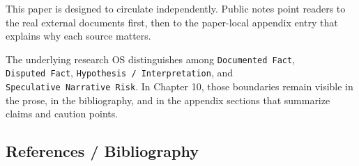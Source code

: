 \documentclass[
  american,
  11pt,
  letterpaper,
]{article}
\begin{document}
This paper is designed to circulate independently. Public notes point
readers to the real external documents first, then to the paper-local
appendix entry that explains why each source matters.

The underlying research OS distinguishes among
\texttt{Documented\ Fact}, \texttt{Disputed\ Fact},
\texttt{Hypothesis\ /\ Interpretation}, and
\texttt{Speculative\ Narrative\ Risk}. In Chapter 10, those boundaries
remain visible in the prose, in the bibliography, and in the appendix
sections that summarize claims and caution points.

\subsection{References / Bibliography}\label{references-bibliography}
\end{document}

